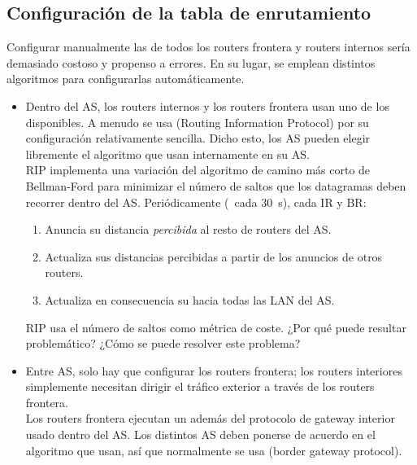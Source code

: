 \subsection{Configuración de la tabla de enrutamiento}\label{sec:layer7:as:routing_table_configurati}

Configurar manualmente las  de todos los routers frontera y routers internos
sería demasiado costoso y propenso a errores. En su lugar, se emplean distintos algoritmos para configurarlas automáticamente.
\begin{itemize}
\item Dentro del AS, los routers internos y los routers frontera usan uno de los
 disponibles.
A menudo se usa  (Routing Information Protocol) por su configuración relativamente sencilla.
Dicho esto, los AS pueden elegir libremente el algoritmo que usan internamente en su AS.\\[-0.2cm]

RIP implementa una variación del algoritmo de camino más corto de Bellman-Ford para minimizar el número de saltos
que los datagramas deben recorrer dentro del AS. Periódicamente (\eg\ cada $30$~s), cada IR y BR:\\[-0.4cm]
% 
  \begin{enumerate}
  \item Anuncia su distancia \textit{percibida} al resto de routers del AS.
  \item Actualiza sus distancias percibidas a partir de los anuncios de otros routers.
  \item Actualiza en consecuencia su  hacia todas las LAN del AS.
  \end{enumerate}

\begin{exercise}
RIP usa el número de saltos como métrica de coste.
% 
¿Por qué puede resultar problemático?
% 
¿Cómo se puede resolver este problema?
\end{exercise}

\vspace{0.25cm}
\item Entre AS, solo hay que configurar los routers frontera; los routers interiores simplemente necesitan dirigir
el tráfico exterior a través de los routers frontera. \\[-0.3cm]

Los routers frontera ejecutan un  además del
protocolo de gateway interior usado dentro del AS. Los distintos AS deben ponerse de acuerdo en el
algoritmo que usan, así que normalmente se usa  (border gateway protocol).\\[-0.3cm]


\end{itemize}
